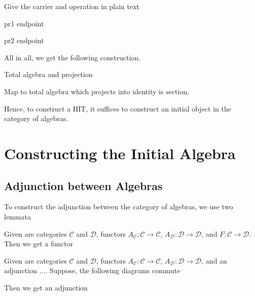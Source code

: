 \documentclass[9pt]{entcs}
\newcommand{\0}{\textbf{0}} %
\newcommand{\1}{\textbf{1}} %
\newcommand{\functor}[2]{#1 \longrightarrow #2} %
\begin{document}
Give the carrier and operation in plain text

\begin{lemma}
pr1 endpoint
\end{lemma}

\begin{lemma}
pr2 endpoint
\end{lemma}

All in all, we get the following construction.

\begin{theorem}
Total algebra and projection
\end{theorem}

\begin{proposition}
Map to total algebra which projects into identity is section.
\end{proposition}

Hence, to construct a HIT, it suffices to construct an initial object in the category of algebras.

\begin{corollary}
	
\end{corollary}

\section{Constructing the Initial Algebra}

\subsection{Adjunction between Algebras}
To construct the adjunction between the category of algebras, we use two lemmata

\begin{lemma}
Given are categories $\mathcal{C}$ and $\mathcal{D}$, functors $A_{\mathcal{C}} : \functor{\mathcal{C}}{\mathcal{C}}$, $A_{\mathcal{D}} : \functor{\mathcal{D}}{\mathcal{D}}$, and $F : \functor{\mathcal{C}}{\mathcal{D}}$.
Then we get a functor 
\end{lemma}

\begin{lemma}
Given are categories $\mathcal{C}$ and $\mathcal{D}$, functors $A_{\mathcal{C}} : \functor{\mathcal{C}}{\mathcal{C}}$, $A_{\mathcal{D}} : \functor{\mathcal{D}}{\mathcal{D}}$, and an adjunction ....
Suppose, the following diagrams commute

Then we get an adjunction
\end{lemma}
\end{document}
